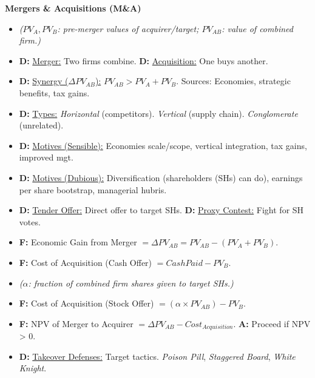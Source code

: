 \documentclass[7pt,landscape]{extarticle} %
\newcommand{\cheatsheetsubsubsection}[1]{%
  \vspace{0.15ex plus 0.05ex minus 0.05ex}%
  \noindent\textbf{\sffamily\scriptsize #1}%
  \par\vspace{0.05ex}%
}
\newcommand{\D}[1]{\textbf{\textcolor{DefColor}{D:}} \uline{#1}}
\newcommand{\F}[1]{\textbf{\textcolor{FormColor}{F:}} #1}
\newcommand{\A}[1]{\textbf{\textcolor{AppColor}{A:}} #1}
\newcommand{\SF}[1]{\textit{\small (#1)}} %
\begin{document}
\begin{multicols*}{4}
  \cheatsheetsubsubsection{Mergers \& Acquisitions (M\&A)}
  \begin{itemize}
    \item \SF{$PV_A, PV_B$: pre-merger values of acquirer/target; $PV_{AB}$: value of combined firm.}
    \item \D{Merger:} Two firms combine. \D{Acquisition:} One buys another.
    \item \D{Synergy ($\Delta PV_{AB}$):} $PV_{AB} > PV_A + PV_B$. Sources: Economies, strategic benefits, tax gains.
    \item \D{Types:} \emph{Horizontal} (competitors). \emph{Vertical} (supply chain). \emph{Conglomerate} (unrelated).
    \item \D{Motives (Sensible):} Economies scale/scope, vertical integration, tax gains, improved mgt.
    \item \D{Motives (Dubious):} Diversification (shareholders (SHs) can do), earnings per share bootstrap, managerial hubris.
    \item \D{Tender Offer:} Direct offer to target SHs. \D{Proxy Contest:} Fight for SH votes.
    \item \F{Economic Gain from Merger $= \Delta PV_{AB} = PV_{AB} - (PV_A + PV_B)$}.
    \item \F{Cost of Acquisition (Cash Offer) $= Cash Paid - PV_B$}.
    \item \SF{$\alpha$: fraction of combined firm shares given to target SHs.}
    \item \F{Cost of Acquisition (Stock Offer) $= (\alpha \times PV_{AB}) - PV_B$}.
    \item \F{NPV of Merger to Acquirer $= \Delta PV_{AB} - Cost_{Acquisition}$}. \A{Proceed if NPV > 0.}
    \item \D{Takeover Defenses:} Target tactics. \emph{Poison Pill}, \emph{Staggered Board}, \emph{White Knight}.
  \end{itemize}
  

\end{multicols*}
\end{document}
